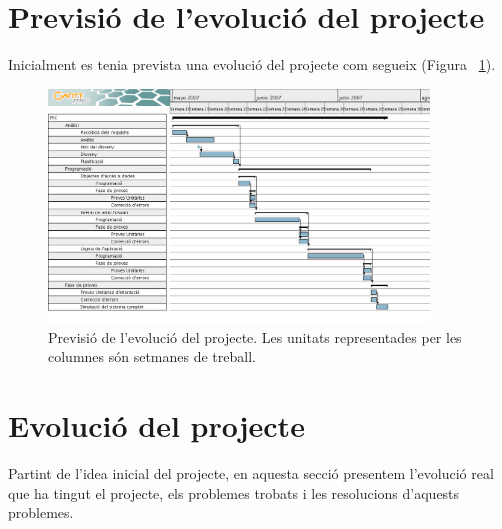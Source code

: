 \documentclass[a4paper]{report}  %
\begin{document}
\section{Previsió de l'evolució del projecte}
Inicialment es tenia prevista una evolució del projecte com segueix (Figura ~\ref{fig:GanttProject}).
		\begin{figure}[H] %
		\begin{center}
		\includegraphics[width=0.90\textwidth,keepaspectratio]{img/GanttProject.png}
		\caption[List caption]{Previsió de l'evolució del projecte. Les unitats representades per les columnes són setmanes de treball.}
		\label{fig:GanttProject}
		\end{center}
		\end{figure}
\section{Evolució del projecte}
Partint de l'idea inicial del projecte, en aquesta secció presentem l'evolució real que ha tingut el projecte, els problemes trobats i les resolucions d'aquests problemes.
\end{document}
